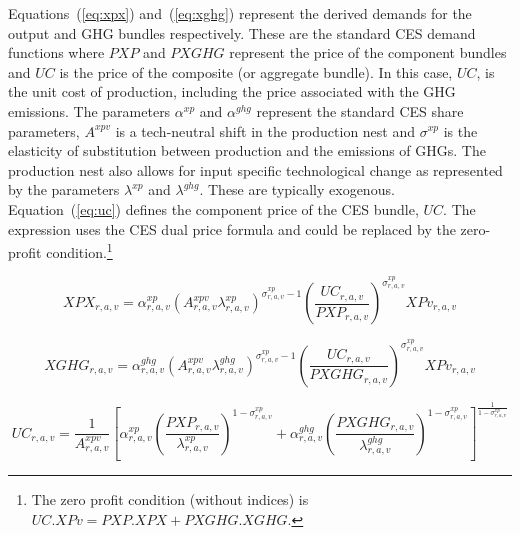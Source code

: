 \documentclass[11pt,letterpaper]{report}
\begin{document}
Equations~(\ref{eq:xpx}) and~(\ref{eq:xghg}) represent the derived demands for
the output and GHG bundles respectively. These are the standard CES demand
functions where $\mathit{PXP}$ and $\mathit{PXGHG}$ represent the price of the
component bundles and $\mathit{UC}$ is the price of the composite (or aggregate
bundle). In this case, $\mathit{UC}$, is the unit cost of production, including
the price associated with the GHG emissions. The parameters
$\alpha^{\mathit{xp}}$ and $\alpha^{\mathit{ghg}}$ represent the standard
CES share parameters, $A^{\mathit{xpv}}$ is a tech-neutral shift in the
production nest and $\sigma^{\mathit{xp}}$ is the elasticity of substitution
between production and the emissions of GHGs. The production nest also allows
for input specific technological change as represented by the parameters
$\lambda^{\mathit{xp}}$ and $\lambda^{\mathit{ghg}}$. These are typically
exogenous. Equation~(\ref{eq:uc}) defines the component price of the CES bundle,
$\mathit{UC}$. The expression uses the CES dual price formula and could be
replaced by the zero-profit condition.\footnote{The zero profit condition
(without indices) is $\mathit{UC}.\mathit{XPv}=\mathit{PXP.XPX} +
\mathit{PXGHG}.\mathit{XGHG}$.}

\begin{equation}
\label{eq:xpx}
\mathit{XPX}_{r,a,v} =
   \alpha^{\mathit{xp}}_{\mathit{r,a,v}}
   \left( A^{\mathit{xpv}}_{\mathit{r,a,v}}
         \lambda^{\mathit{xp}}_{\mathit{r,a,v}}
   \right)^{\sigma^{\mathit{xp}}_{\mathit{r,a,v}}-1}
   \left( \frac {\mathit{UC}_{r,a,v}} {\mathit{PXP}_{r,a,v} }
   \right)^{\sigma^{\mathit{xp}}_{\mathit{r,a,v}}}
   \mathit{XPv}_{r,a,v}
\end{equation}

\begin{equation}
\label{eq:xghg}
\mathit{XGHG}_{r,a,v} =
   \alpha^{\mathit{ghg}}_{\mathit{r,a,v}}
   \left( A^{\mathit{xpv}}_{\mathit{r,a,v}}
      \lambda^{\mathit{ghg}}_{\mathit{r,a,v}}
   \right)^{\sigma^{\mathit{xp}}_{\mathit{r,a,v}}-1}
   \left( \frac{\mathit{UC}_{r,a,v}} {\mathit{PXGHG}_{r,a,v} }
   \right)^{\sigma^{\mathit{xp}}_{\mathit{r,a,v}}}
   \mathit{XPv}_{r,a,v}
\end{equation}

\begin{equation}
\label{eq:uc}
\mathit{UC}_{r,a,v} =
   \frac {1} {A^{\mathit{xpv}}_{\mathit{r,a,v}}}
   \left[
      \alpha^{\mathit{xp}}_{\mathit{r,a,v}}
      \left( \frac {\mathit{PXP}_{r,a,v}}
         {\lambda^{\mathit{xp}}_{\mathit{r,a,v}}}
      \right)^{1 - \sigma^{\mathit{xp}}_{\mathit{r,a,v}}}
   +  \alpha^{\mathit{ghg}}_{\mathit{r,a,v}}
      \left( \frac {\mathit{PXGHG}_{r,a,v}}
         {\lambda^{\mathit{ghg}}_{\mathit{r,a,v}}}
      \right)^{1 - \sigma^{\mathit{xp}}_{\mathit{r,a,v}}}
   \right]^{\frac {1} {1 - \sigma^{\mathit{xp}}_{\mathit{r,a,v}}}}
\end{equation}
\end{document}
